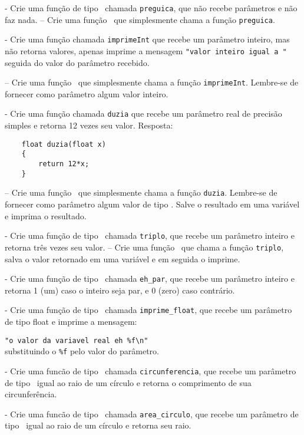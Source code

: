 \NEWLINE
\quest - Crie uma função de tipo \VOID\ chamada {\tt preguica}, que não recebe parâmetros e não faz nada.
\NEWLINE
\quest – Crie uma função \MAIN\ que simplesmente chama a função {\tt preguica}.

\NEWLINE
\quest - Crie uma função chamada {\tt imprimeInt} que recebe um parâmetro inteiro, mas não retorna valores, apenas imprime a mensagem \verb|"valor inteiro igual a "| seguida do valor do parâmetro recebido.

\NEWLINE
\quest – Crie uma função \MAIN\ que simplesmente chama a função {\tt imprimeInt}. Lembre-se de fornecer como parâmetro algum valor inteiro.

\NEWLINE
\quest - Crie uma função chamada {\tt duzia} que recebe um parâmetro real de precisão simples e retorna 12 vezes seu valor.
	Resposta:
\begin{lstlisting}
	float duzia(float x)
	{
		return 12*x;
	}
\end{lstlisting}
\NEWLINE
\quest – Crie uma função \MAIN\ que simplesmente chama a função {\tt duzia}. Lembre-se de fornecer como parâmetro algum valor de tipo \FLOAT. Salve o resultado em uma variável e imprima o resultado.

\NEWLINE
\quest - Crie uma função de tipo \INT\ chamada {\tt triplo}, que recebe um parâmetro inteiro e retorna três vezes seu valor.
\NEWLINE
\quest – Crie uma função \MAIN\ que chama a função {\tt triplo}, salva o valor retornado em uma variável e em seguida o imprime.

\NEWLINE
\quest - Crie uma função de tipo \INT\ chamada \verb|eh_par|, que recebe um parâmetro inteiro e retorna 1 (um) caso o inteiro seja par, e 0 (zero) caso contrário.

\NEWLINE
\quest - Crie uma função de tipo \VOID\ chamada \verb|imprime_float|, que recebe um parâmetro de tipo float e imprime a mensagem:

\verb|"o valor da variavel real eh %f\n"|
\\
substituindo o \verb|%f| pelo valor do parâmetro.



\NEWLINE
\quest - Crie uma funcão de tipo \FLOAT\ chamada \verb|circunferencia|, que recebe um parâmetro de tipo \FLOAT\ igual ao raio de um círculo e retorna o comprimento de sua circunferência.

\NEWLINE
\quest - Crie uma funcão de tipo \FLOAT\ chamada \verb|area_circulo|, que recebe um parâmetro de tipo \FLOAT\ igual ao raio de um círculo e retorna seu raio.

